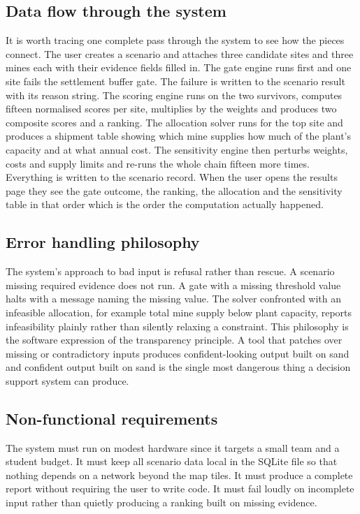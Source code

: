 \documentclass[12pt,a4paper]{report}
\begin{document}
\subsection{Data flow through the system}
It is worth tracing one complete pass through the system to see how
the pieces connect. The user creates a scenario and attaches three
candidate sites and three mines each with their evidence fields filled
in. The gate engine runs first and one site fails the settlement
buffer gate. The failure is written to the scenario result with its
reason string. The scoring engine runs on the two survivors, computes
fifteen normalised scores per site, multiplies by the weights and
produces two composite scores and a ranking. The allocation solver
runs for the top site and produces a shipment table showing which
mine supplies how much of the plant's capacity and at what annual
cost. The sensitivity engine then perturbs weights, costs and supply
limits and re-runs the whole chain fifteen more times. Everything is
written to the scenario record. When the user opens the results page
they see the gate outcome, the ranking, the allocation and the
sensitivity table in that order which is the order the computation
actually happened.

\subsection{Error handling philosophy}
The system's approach to bad input is refusal rather than rescue. A
scenario missing required evidence does not run. A gate with a missing
threshold value halts with a message naming the missing value. The
solver confronted with an infeasible allocation, for example total
mine supply below plant capacity, reports infeasibility plainly rather
than silently relaxing a constraint. This philosophy is the software
expression of the transparency principle. A tool that patches over
missing or contradictory inputs produces confident-looking output
built on sand and confident output built on sand is the single most
dangerous thing a decision support system can produce.

\subsection{Non-functional requirements}
The system must run on modest hardware since it targets a small team
and a student budget. It must keep all scenario data local in the
SQLite file so that nothing depends on a network beyond the map tiles.
It must produce a complete report without requiring the user to write
code. It must fail loudly on incomplete input rather than quietly
producing a ranking built on missing evidence.
\end{document}
